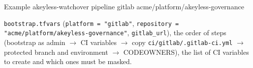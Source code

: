 \begin{session}{Example}
\you akeyless-watchover pipeline gitlab acme/platform/akeyless-governance

\agent \texttt{bootstrap.tfvars} (\texttt{platform = "gitlab"}, \texttt{repository = "acme/platform/akeyless-governance"},
\texttt{gitlab\_url}), the order of steps (bootstrap as admin $\rightarrow$ CI variables $\rightarrow$
copy \texttt{ci/gitlab/.gitlab-ci.yml} $\rightarrow$ protected branch and environment $\rightarrow$
CODEOWNERS), the list of CI variables to create and which ones must be masked.
\end{session}
